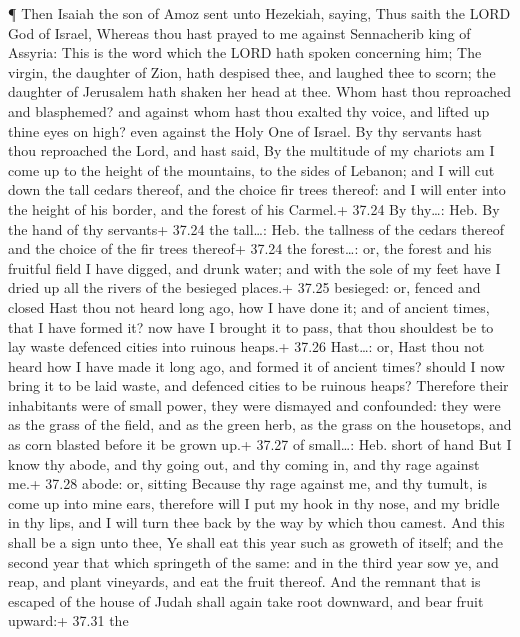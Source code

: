  ¶ Then Isaiah the son of Amoz sent unto Hezekiah, saying,
Thus saith the LORD God of Israel, Whereas thou hast prayed to me
against Sennacherib king of Assyria:  This is the word
which the LORD hath spoken concerning him; The virgin, the daughter of
Zion, hath despised thee, and laughed thee to scorn; the daughter of
Jerusalem hath shaken her head at thee.  Whom hast thou
reproached and blasphemed? and against whom hast thou exalted thy voice,
and lifted up thine eyes on high? even against the Holy One of Israel.
 By thy servants hast thou reproached the Lord, and hast
said, By the multitude of my chariots am I come up to the height of the
mountains, to the sides of Lebanon; and I will cut down the tall cedars
thereof, and the choice fir trees thereof: and I will enter into the
height of his border, and the forest of his Carmel.+ 37.24 By thy\ldots:
Heb. By the hand of thy servants+ 37.24 the tall\ldots: Heb. the
tallness of the cedars thereof and the choice of the fir trees thereof+
37.24 the forest\ldots: or, the forest and his fruitful field
 I have digged, and drunk water; and with the sole of my
feet have I dried up all the rivers of the besieged places.+ 37.25
besieged: or, fenced and closed  Hast thou not heard long
ago, how I have done it; and of ancient times, that I have formed it?
now have I brought it to pass, that thou shouldest be to lay waste
defenced cities into ruinous heaps.+ 37.26 Hast\ldots: or, Hast thou not
heard how I have made it long ago, and formed it of ancient times?
should I now bring it to be laid waste, and defenced cities to be
ruinous heaps?  Therefore their inhabitants were of small
power, they were dismayed and confounded: they were as the grass of the
field, and as the green herb, as the grass on the housetops, and as corn
blasted before it be grown up.+ 37.27 of small\ldots: Heb. short of hand
 But I know thy abode, and thy going out, and thy coming
in, and thy rage against me.+ 37.28 abode: or, sitting 
Because thy rage against me, and thy tumult, is come up into mine ears,
therefore will I put my hook in thy nose, and my bridle in thy lips, and
I will turn thee back by the way by which thou camest.  And
this shall be a sign unto thee, Ye shall eat this year such as groweth
of itself; and the second year that which springeth of the same: and in
the third year sow ye, and reap, and plant vineyards, and eat the fruit
thereof.  And the remnant that is escaped of the house of
Judah shall again take root downward, and bear fruit upward:+ 37.31 the
